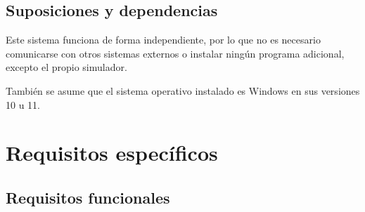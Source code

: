 \subsection{Suposiciones y dependencias}



Este sistema funciona de forma independiente, por lo que no es necesario comunicarse con otros sistemas externos o instalar ningún programa adicional, excepto el propio simulador.

\bigskip

También se asume que el sistema operativo instalado es Windows en sus versiones 10 u 11.

\section{Requisitos específicos}
\label{sec:req-especificos}
\subsection{Requisitos funcionales}


